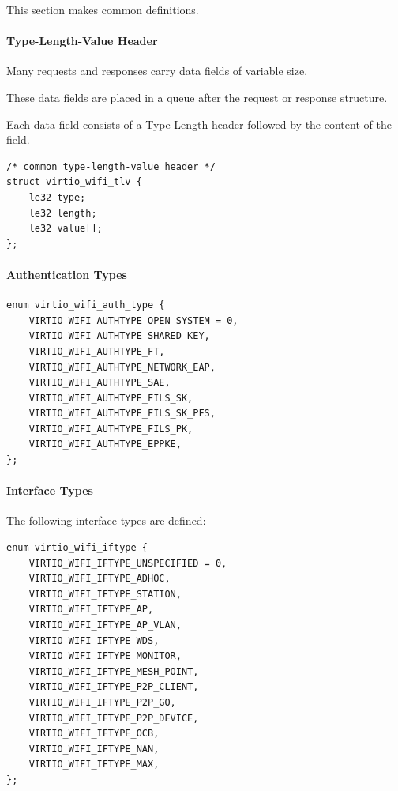 This section makes common definitions.

\paragraph{Type-Length-Value Header}\label{sec:Device Types / 802.11 Device / Device Operation / Common Definitions / Type-Length-Value Header}

Many requests and responses carry data fields of variable size.

These data fields are placed in a queue after the request or response structure.

Each data field consists of a Type-Length header followed by the content of the field.

\begin{lstlisting}
/* common type-length-value header */
struct virtio_wifi_tlv {
	le32 type;
	le32 length;
	le32 value[];
};
\end{lstlisting}

\paragraph{Authentication Types}\label{sec:Device Types / 802.11 Device / Device Operation / Common Definitions / Authentication Types}

\label{def:Device Types / 802.11 Device / Device Operation / Common Definitions / Interface Types / enum virtio_wifi_auth_type}
\begin{lstlisting}
enum virtio_wifi_auth_type {
	VIRTIO_WIFI_AUTHTYPE_OPEN_SYSTEM = 0,
	VIRTIO_WIFI_AUTHTYPE_SHARED_KEY,
	VIRTIO_WIFI_AUTHTYPE_FT,
	VIRTIO_WIFI_AUTHTYPE_NETWORK_EAP,
	VIRTIO_WIFI_AUTHTYPE_SAE,
	VIRTIO_WIFI_AUTHTYPE_FILS_SK,
	VIRTIO_WIFI_AUTHTYPE_FILS_SK_PFS,
	VIRTIO_WIFI_AUTHTYPE_FILS_PK,
	VIRTIO_WIFI_AUTHTYPE_EPPKE,
};
\end{lstlisting}

\paragraph{Interface Types}\label{sec:Device Types / 802.11 Device / Device Operation / Common Definitions / Interface Types}

\label{def:Device Types / 802.11 Device / Device Operation / Common Definitions / Interface Types / enum virtio_wifi_iftype}The following interface types are defined:

\begin{lstlisting}
enum virtio_wifi_iftype {
	VIRTIO_WIFI_IFTYPE_UNSPECIFIED = 0,
	VIRTIO_WIFI_IFTYPE_ADHOC,
	VIRTIO_WIFI_IFTYPE_STATION,
	VIRTIO_WIFI_IFTYPE_AP,
	VIRTIO_WIFI_IFTYPE_AP_VLAN,
	VIRTIO_WIFI_IFTYPE_WDS,
	VIRTIO_WIFI_IFTYPE_MONITOR,
	VIRTIO_WIFI_IFTYPE_MESH_POINT,
	VIRTIO_WIFI_IFTYPE_P2P_CLIENT,
	VIRTIO_WIFI_IFTYPE_P2P_GO,
	VIRTIO_WIFI_IFTYPE_P2P_DEVICE,
	VIRTIO_WIFI_IFTYPE_OCB,
	VIRTIO_WIFI_IFTYPE_NAN,
	VIRTIO_WIFI_IFTYPE_MAX,
};
\end{lstlisting}

